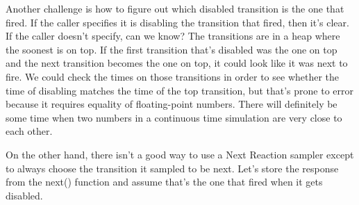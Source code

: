 \documentclass{article}
\begin{document}
Another challenge is how to figure out which disabled transition is the one that fired. If the caller specifies it is disabling the transition that fired, then it's clear. If the caller doesn't specify, can we know? The transitions are in a heap where the soonest is on top. If the first transition that's disabled was the one on top and the next transition becomes the one on top, it could look like it was next to fire. We could check the times on those transitions in order to see whether the time of disabling matches the time of the top transition, but that's prone to error because it requires equality of floating-point numbers. There will definitely be some time when two numbers in a continuous time simulation are very close to each other.

On the other hand, there isn't a good way to use a Next Reaction sampler except to always choose the transition it sampled to be next. Let's store the response from the next() function and assume that's the one that fired when it gets disabled.
\end{document}

